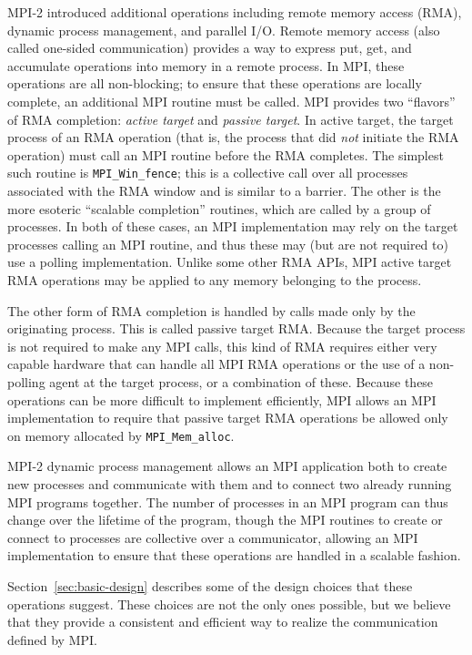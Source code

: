 \documentclass{article}
\def\code#1{\texttt{#1}}
\begin{document}
MPI-2 introduced additional operations including remote memory access (RMA),
dynamic process management, and parallel I/O.  Remote memory
access (also called one-sided communication) provides a way to express
put, get, and accumulate operations into memory in a remote process.
In MPI, these operations are all non-blocking; to ensure that these
operations are locally complete, an additional MPI routine must be
called.  MPI provides two ``flavors'' of RMA completion: \emph{active target}
and \emph{passive target}.  In active target, the target process of an
RMA operation (that is, the process that did \emph{not} initiate the
RMA operation) must call an MPI routine before the RMA completes.  The
simplest such routine is \code{MPI_Win_fence}; this is a collective call over
all 
processes associated with the RMA window and is similar to a barrier.
The other is the more esoteric ``scalable completion'' routines, which
are called by a group of processes.  In both of these cases, an MPI
implementation may rely on the target processes calling an MPI
routine, and thus these may (but are not required to) use a polling
implementation.   Unlike some other RMA APIs, MPI active target
RMA operations may be applied to any memory belonging to the process.

The other form of RMA completion is handled by calls made only by the
originating process.  This is called passive target RMA.  Because the
target process is not required to make any MPI calls, this kind of RMA
requires either very capable hardware that can handle all MPI RMA
operations or the use of a non-polling agent at the target process, or a
combination of these.
Because these operations can be more difficult to implement
efficiently, MPI allows an MPI implementation to require that passive
target RMA operations be allowed only on memory allocated by
\code{MPI_Mem_alloc}.  

MPI-2 dynamic process management allows an MPI application both to
create new processes and communicate with them and to connect two
already running MPI programs together.  The number of processes in an
MPI program can thus change over the lifetime of the program, though
the MPI routines to create or connect to processes are collective over
a communicator, allowing an MPI implementation to ensure that these
operations are handled in a scalable fashion.

Section~\ref{sec:basic-design} describes some of the design choices that these
operations suggest.  These choices are not the only ones possible, but
we believe that they provide a consistent and efficient way to realize
the communication defined by MPI.
\end{document}
